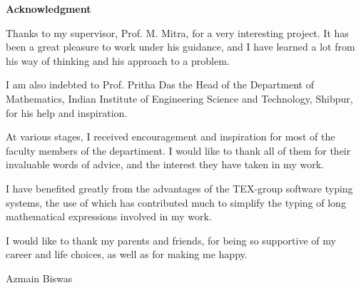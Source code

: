 \vspace{5cm}
\begin{center}
    \LARGE{\textbf{Acknowledgment}}
\end{center}
\vspace{2cm}
    Thanks to my supervisor, Prof. M. Mitra, for a very interesting project. It has been a great pleasure to work under his guidance, and I have learned a lot from his way of thinking and his approach to a problem. 
    \vspace{0.2cm}

    I am also indebted to Prof. Pritha Das the Head of the Department of Mathematics, Indian Institute of Engineering Science and Technology, Shibpur, for his help and inspiration. 
    
    \vspace{0.2cm}
    At various stages, I received encouragement and inspiration for most of the faculty members of the departiment. I would like to thank all of them for their invaluable words of advice, and the interest they have taken in my work.

    \vspace{0.2cm}
    I have benefited greatly from the advantages of the TEX-group software typing systems, the use of which has contributed much to simplify the typing of long mathematical expressions involved in my work.

    \vspace{0.2cm}
    I would like to thank my parents and friends, for being so supportive of my career and life choices, as well as for making me happy.

    \vspace{2cm}
    \begin{flushright}
        Azmain Biswas
    \end{flushright}
